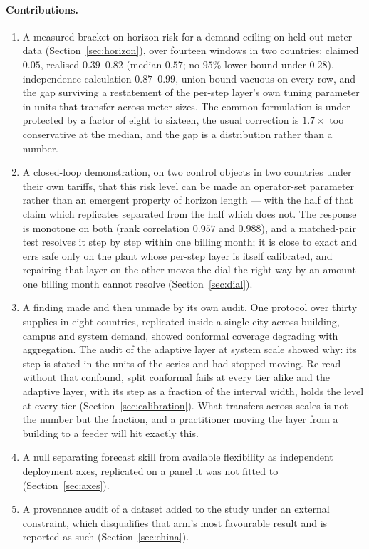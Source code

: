 \paragraph{Contributions.}
\begin{enumerate}
  \item A measured bracket on horizon risk for a demand ceiling on held-out
        meter data (Section~\ref{sec:horizon}), over fourteen windows in two
        countries: claimed $0.05$, realised $0.39$--$0.82$ (median $0.57$;
        no $95\%$ lower bound under $0.28$), independence calculation
        $0.87$--$0.99$, union bound vacuous on every row, and the gap surviving
        a restatement of the per-step layer's own tuning parameter in units
        that transfer across meter sizes. The common formulation is under-protected by a factor of eight to
        sixteen, the usual correction is $1.7\times$ too conservative at the
        median, and the gap is a distribution rather than a number.
  \item A closed-loop demonstration, on two control objects in two countries
        under their own tariffs, that this risk level can be made an
        operator-set parameter rather than an emergent property of horizon
        length --- with the half of that claim which replicates separated from
        the half which does not. The response is monotone on both (rank
        correlation $0.957$ and $0.988$), and a matched-pair test resolves it
        step by step within one billing month; it is close to exact and errs safe
        only on the plant whose per-step layer is itself calibrated, and
        repairing that layer on the other moves the dial the right way by an
        amount one billing month cannot resolve (Section~\ref{sec:dial}).
  \item A finding made and then unmade by its own audit. One protocol over
        thirty supplies in eight countries, replicated inside a single city
        across building, campus and system demand, showed conformal coverage
        degrading with aggregation. The audit of the adaptive layer at system
        scale showed why: its step is stated in the units of the series and had
        stopped moving. Re-read without that confound, split conformal fails at
        every tier alike and the adaptive layer, with its step as a fraction of
        the interval width, holds the level at every tier
        (Section~\ref{sec:calibration}). What transfers across scales is not
        the number but the fraction, and a practitioner moving the layer from a
        building to a feeder will hit exactly this.
  \item A null separating forecast skill from available flexibility as
        independent deployment axes, replicated on a panel it was not fitted to
        (Section~\ref{sec:axes}).
  \item A provenance audit of a dataset added to the study under an external
        constraint, which disqualifies that arm's most favourable result and is
        reported as such (Section~\ref{sec:china}).
\end{enumerate}

